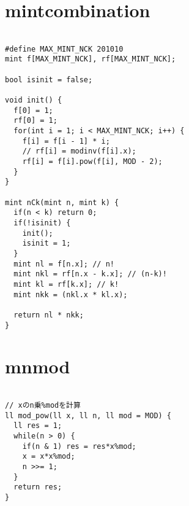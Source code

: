 \documentclass[a4j,titlepage]{jarticle} %
\begin{document}
\section{mintcombination}
\color{black}
\begin{lstlisting}[caption=mintcombination]

#define MAX_MINT_NCK 201010
mint f[MAX_MINT_NCK], rf[MAX_MINT_NCK];

bool isinit = false;

void init() {
  f[0] = 1;
  rf[0] = 1;
  for(int i = 1; i < MAX_MINT_NCK; i++) {
    f[i] = f[i - 1] * i;
    // rf[i] = modinv(f[i].x);
    rf[i] = f[i].pow(f[i], MOD - 2);
  }
}

mint nCk(mint n, mint k) {
  if(n < k) return 0;
  if(!isinit) {
    init();
    isinit = 1;
  }
  mint nl = f[n.x]; // n!
  mint nkl = rf[n.x - k.x]; // (n-k)!
  mint kl = rf[k.x]; // k!
  mint nkk = (nkl.x * kl.x);

  return nl * nkk;
}

\end{lstlisting}

\color{white}
\section{mnmod}
\color{black}
\begin{lstlisting}[caption=mnmod]

// xのn乗%modを計算
ll mod_pow(ll x, ll n, ll mod = MOD) {
  ll res = 1;
  while(n > 0) {
    if(n & 1) res = res*x%mod;
    x = x*x%mod;
    n >>= 1;
  }
  return res;
}

\end{lstlisting}

\color{white}
\end{document}
